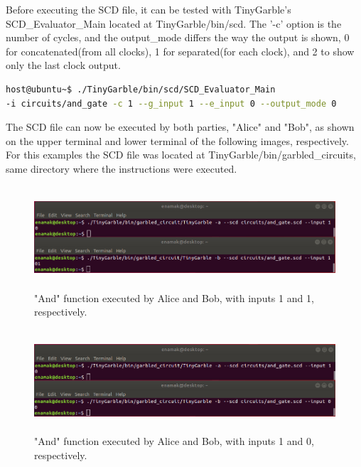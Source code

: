 \begin{refsection}
Before executing the SCD file, it can be tested with TinyGarble's SCD\_Evaluator\_Main located at TinyGarble/bin/scd. The '-c' option is the number of cycles, and the output\_mode differs the way the output is shown, 0 for concatenated(from all clocks), 1 for separated(for each clock), and 2 to show only the last clock output.

\begin{lstlisting}[caption={Testing a SCD file}, language=bash, captionpos=b]
host@ubuntu~$ ./TinyGarble/bin/scd/SCD_Evaluator_Main 
-i circuits/and_gate -c 1 --g_input 1 --e_input 0 --output_mode 0
\end{lstlisting}

\newpage

The SCD file can now be executed by both parties, "Alice" and "Bob", as shown on the upper terminal and lower terminal of the following images, respectively.
For this examples the SCD file was located at TinyGarble/bin/garbled\_circuits, same directory where the instructions were executed.

\begin{figure}[H]
	\centering
	\includegraphics[width=1\textwidth, height=3.8cm]{./sdf/tiny_garble/figures/tinygarble_and_a.png}
    \caption{"And" function executed by Alice and Bob, with inputs 1 and 1, respectively.}\label{fig:tinygarble_and_a}
\end{figure}

\begin{figure}[H]
	\centering
	\includegraphics[width=1\textwidth, height=3.8cm]{./sdf/tiny_garble/figures/tinygarble_and_b.png}
    \caption{"And" function executed by Alice and Bob, with inputs 1 and 0, respectively.}\label{fig:tinygarble_and_b}
\end{figure}


\end{refsection}
